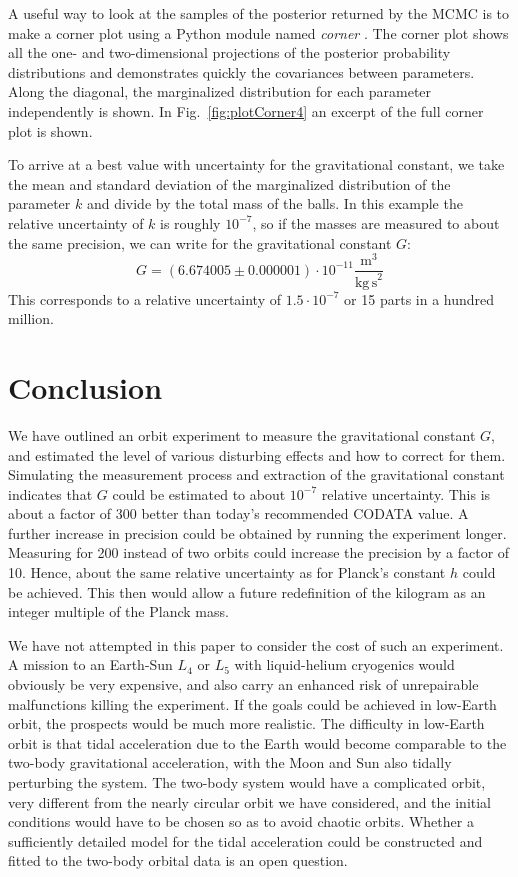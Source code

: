 \documentclass[]{rsos}
\begin{document}
A useful way to look at the samples of the posterior returned by the MCMC is to make a corner plot using a Python module named \textit{corner} \citep{corner}. The corner plot shows all the one- and two-dimensional projections of the posterior probability distributions and demonstrates quickly the covariances between parameters. Along the diagonal, the marginalized distribution for each parameter independently is shown.
In Fig.~\ref{fig:plotCorner4} an excerpt of the full corner plot is shown. 

To arrive at a best value with uncertainty for the gravitational constant, we take the mean and standard deviation of the marginalized distribution of the parameter $k$ and divide by the total mass of the balls. In this example the relative uncertainty of $k$ is roughly $10^{-7}$, so if the masses are measured to about the same precision, we can write for the gravitational constant $G$:
\begin{equation}\label{Gfit}
G = \left(6.674005 \pm 0.000001 \right) \cdot 10^{-11}  \frac{\mathrm{m}^3}{\mathrm{kg \, s}^2}
\end{equation}
This corresponds to a relative uncertainty of $1.5 \cdot 10^{-7}$ or 15 parts in a hundred million.

\section{Conclusion}
We have outlined an orbit experiment to measure the gravitational
constant $G$, and estimated the level of various disturbing effects
and how to correct for them.  Simulating the measurement process and
extraction of the gravitational constant indicates that $G$ could be
estimated to about $10^{-7}$ relative uncertainty.  This is about a
factor of 300 better than today's recommended CODATA value. A further increase in precision could be obtained by running the experiment longer. Measuring for 200 instead of two orbits could increase the precision by a factor of 10.
Hence, about the same relative uncertainty as for Planck's constant
$h$ \citep[$1.2 \cdot 10^{-8}$][]{CODATA17} could be achieved. This then
would allow a future redefinition of the kilogram as an integer
multiple of the Planck mass.

We have not attempted in this paper to consider the cost of such an
experiment.  A mission to an Earth-Sun $L_4$ or $L_5$ with
liquid-helium cryogenics would obviously be very expensive, and also
carry an enhanced risk of unrepairable malfunctions killing the
experiment.  If the goals could be achieved in low-Earth orbit, the
prospects would be much more realistic.  The difficulty in low-Earth
orbit is that tidal acceleration due to the Earth would become
comparable to the two-body gravitational acceleration, with the Moon
and Sun also tidally perturbing the system.  The two-body system would
have a complicated orbit, very different from the nearly circular
orbit we have considered, and the initial conditions would have to be
chosen so as to avoid chaotic orbits.  Whether a sufficiently detailed
model for the tidal acceleration could be constructed and fitted to
the two-body orbital data is an open question.


\def\nat{Nature}
\def\prd{PRD}



\end{document}
